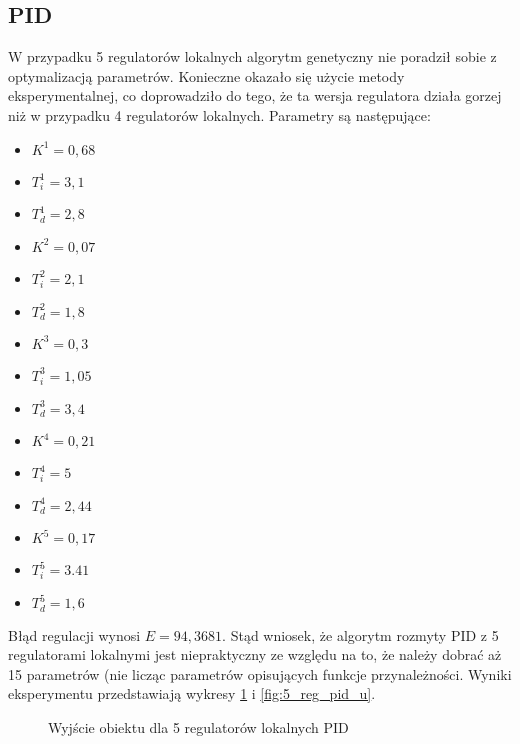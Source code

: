 \subsection{PID}
W przypadku 5 regulatorów lokalnych algorytm genetyczny nie poradził sobie z optymalizacją parametrów. Konieczne okazało się użycie metody eksperymentalnej, co doprowadziło do tego, że ta wersja regulatora działa gorzej niż w przypadku 4 regulatorów lokalnych. Parametry są następujące:
\begin{itemize}
\item $K^1 = 0,68$
\item $T^1_i = 3,1$
\item $T^1_d = 2,8$
\\
\item $K^2 = 0,07$
\item $T^2_i = 2,1$
\item $T^2_d = 1,8$
\\
\item $K^3 = 0,3$
\item $T^3_i = 1,05$
\item $T^3_d = 3,4$
\\
\item $K^4 = 0,21$
\item $T^4_i = 5$
\item $T^4_d = 2,44$
\\
\item $K^5 = 0,17$
\item $T^5_i = 3.41$
\item $T^5_d = 1,6$
\end{itemize}
Błąd regulacji wynosi $E=94,3681$. Stąd wniosek, że algorytm rozmyty PID z 5 regulatorami lokalnymi jest niepraktyczny ze względu na to, że należy dobrać aż 15 parametrów (nie licząc parametrów opisujących funkcje przynależności. Wyniki eksperymentu przedstawiają wykresy \ref{fig:5_reg_pid_y} i \ref{fig:5_reg_pid_u}.
\begin{figure}[H]
\centering
{}
\caption{Wyjście obiektu dla 5 regulatorów lokalnych PID}
\label{fig:5_reg_pid_y}
\end{figure}

